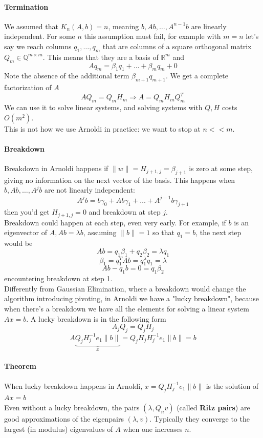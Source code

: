 \documentclass[10pt]{report}
\begin{document}
\paragraph{Termination} We assumed that $K_n(A,b) = n$, meaning $b, Ab, \ldots, A^{n-1}b$ are linearly independent. For some $n$ this assumption must fail, for example with $m=n$ let's say we reach columns $q_1,\ldots,q_m$ that are columns of a square orthogonal matrix $Q_m\in\mathbb{Q}^{m\times m}$. This means that they are a basis of $\mathbb{R}^m$ and $$Aq_m = \beta_1q_1 + \ldots + \beta_mq_m + 0$$ Note the absence of the additional term $\beta_{m+1}q_{m+1}$. We get a complete factorization of $A$ $$AQ_m=Q_mH_m\Rightarrow A=Q_mH_mQ_m^T$$ We can use it to solve linear systems, and solving systems with $Q,H$ costs $O(m^2)$.\\
This is not how we use Arnoldi in practice: we want to stop at $n << m$.
\paragraph{Breakdown} Breakdown in Arnoldi happens if $\|w\|= H_{j+1,j} = \beta_{j+1}$ is zero at some step, giving no information on the next vector of the basis. This happens when $b,Ab,\ldots,A^jb$ are not linearly independent:
$$A^jb = b\gamma_0+Ab\gamma_1+\ldots+A^{j-1}b\gamma_{j+1}$$
then you'd get $H_{j+1,j}=0$ and breakdown at step $j$.\\
Breakdown could happen at each step, even very early. For example, if $b$ is an eigenvector of $A, Ab= \lambda b$, assuming $\|b\|=1$ so that $q_1=b$, the next step would be
$$Ab = q_1\beta_1+q_2\beta_2 = \lambda q_1$$
$$\beta_1 = q_1^TAb = q_1^\lambda q_1 = \lambda$$
$$Ab-q_1b = 0 = q_1\beta_2$$
encountering breakdown at step 1.\\
Differently from Gaussian Elimination, where a breakdown would change the algorithm introducing pivoting, in Arnoldi we have a "lucky breakdown", because when there's a breakdown we have all the elements for solving a linear system $Ax=b$. A lucky breakdown is in the following form $$A_jQ_j = Q_jH_j$$
$$A\underset{x}{\underbrace{Q_jH_j^{-1}e_1\|b\|}} = Q_jH_jH_j^{-1}e_1\|b\|=b$$
\paragraph{Theorem} When lucky breakdown happens in Arnoldi, $x=Q_jH_j^{-1}e_1\|b\|$ is the solution of $Ax = b$\\
Even without a lucky breakdown, the pairs $(\lambda, Q_nv)$ (called \textbf{Ritz pairs}) are good approximations of the eigenpairs $(\lambda, v)$. Typically they converge to the largest (in modulus) eigenvalues of $A$ when one increases $n$.
\end{document}
